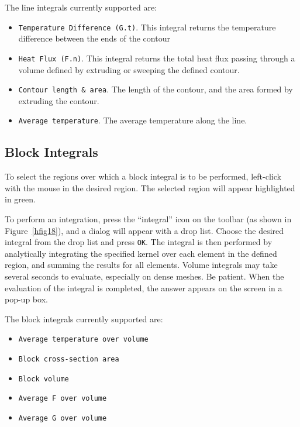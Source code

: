 The line integrals currently supported are:


\begin{itemize}


\item \texttt{Temperature Difference (G.t)}. This integral returns the 
temperature difference between the ends of the contour

\item \texttt{Heat Flux (F.n)}. This integral returns the total heat flux passing through
a volume defined by extruding or sweeping the defined contour.

\item \texttt{Contour length \& area}. The length of the contour, and the area formed by
extruding the contour.

\item \texttt{Average temperature}. The average temperature along the line.
\end{itemize}



\subsection{Block Integrals}

To select the regions over which a block integral is to be performed,
left-click with the mouse in the desired region. The selected region will
appear highlighted in green.

To perform an integration, press the ``integral'' icon on the
toolbar (as shown in Figure~\ref{hfig18}), and a dialog will appear
with a drop list. Choose the desired integral from the drop list
and press \texttt{OK}. The integral is then performed by
analytically integrating the specified kernel over each element in
the defined region, and summing the results for all elements.
Volume integrals may take several seconds to evaluate, especially
on dense meshes. Be patient. When the evaluation of the integral is
completed, the answer appears on the screen in a pop-up box.

The block integrals currently supported are:

\begin{itemize}

\item \texttt{Average temperature over volume}

\item \texttt{Block cross-section area}

\item \texttt{Block volume}

\item \texttt{Average F over volume}

\item \texttt{Average G over volume}

\end{itemize}


